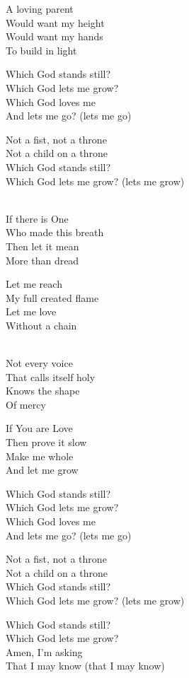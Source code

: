 \begin{lyrics}
A loving parent\\
Would want my height\\
Would want my hands\\
To build in light

Which God stands still?\\
Which God lets me grow?\\
Which God loves me\\
And lets me go? (lets me go)

Not a fist, not a throne\\
Not a child on a throne\\
Which God stands still?\\
Which God lets me grow? (lets me grow)

\\
If there is One\\
Who made this breath\\
Then let it mean\\
More than dread

Let me reach\\
My full created flame\\
Let me love\\
Without a chain

\\
Not every voice\\
That calls itself holy\\
Knows the shape\\
Of mercy

If You are Love\\
Then prove it slow\\
Make me whole\\
And let me grow

Which God stands still?\\
Which God lets me grow?\\
Which God loves me\\
And lets me go? (lets me go)

Not a fist, not a throne\\
Not a child on a throne\\
Which God stands still?\\
Which God lets me grow? (lets me grow)

Which God stands still?\\
Which God lets me grow?\\
Amen, I’m asking\\
That I may know (that I may know)
\end{lyrics}

